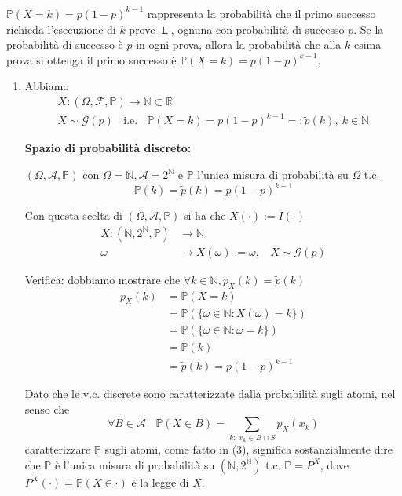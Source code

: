 \subsubsection{}
\begin{oss}
$\mathbb{P}( X=k) =p( 1-p)^{k-1}$ rappresenta la probabilità che il primo successo richieda l'esecuzione di $k$ prove $\Bot $, ognuna con probabilità di successo $p$. Se la probabilità di successo è $p$ in ogni prova, allora la probabilità che alla $k$ esima prova si ottenga il primo successo è $\mathbb{P}( X=k) =p( 1-p)^{k-1}$.
\end{oss}
\begin{enumerate}
\item Abbiamo\begin{gather*}
X:( \Omega ,\mathcal{F} ,\mathbb{P})\rightarrow \mathbb{N} \subset \mathbb{R}\\
X\sim \mathcal{G}( p) \ \ \ \ \text{i.e.} \ \ \ \ \mathbb{P}( X=k) =p( 1-p)^{k-1} =:\tilde{p}( k) ,\ k\in \mathbb{N}
\end{gather*}

\textbf{Spazio di probabilità discreto:}

$( \Omega ,\mathcal{A} ,\mathbb{P})$ con $\Omega =\mathbb{N} ,\mathcal{A} =2^{\mathbb{N}}$ e $\mathbb{P}$ l'unica misura di probabilità su $\Omega $ t.c.\begin{equation}
\mathbb{P}( k) =\tilde{p}( k) =p( 1-p)^{k-1}
\end{equation}

Con questa scelta di $( \Omega ,\mathcal{A} ,\mathbb{P})$ si ha che $X( \cdotp ) :=I( \cdotp )$\begin{align*}
X:\left(\mathbb{N} ,2^{\mathbb{N}} ,\mathbb{P}\right) & \rightarrow \mathbb{N}\\
\omega  & \rightarrow X( \omega ) :=\omega ,\ \ \ \ X\sim \mathcal{G}( p)
\end{align*}

Verifica: dobbiamo mostrare che $\forall k\in \mathbb{N} ,p_{X}( k) =\tilde{p}( k)$\begin{align*}
p_{X}( k) & =\mathbb{P}( X=k)\\
 & =\mathbb{P}(\{\omega \in \mathbb{N} :X( \omega ) =k\})\\
 & =\mathbb{P}(\{\omega \in \mathbb{N} :\omega =k\})\\
 & =\mathbb{P}( k)\\
 & =\tilde{p}( k) =p( 1-p)^{k-1}
\end{align*}

\begin{oss}
Dato che le v.c. discrete sono caratterizzate dalla probabilità sugli atomi, nel senso che
\begin{equation*}
\forall B\in \mathcal{A} \ \ \ \ \mathbb{P}( X\in B) =\sum\limits _{k:\ x_{k} \in B\cap S} p_{X}( x_{k})
\end{equation*}
caratterizzare $\mathbb{P}$ sugli atomi, come fatto in (3), significa sostanzialmente dire che $\mathbb{P}$ è l'unica misura di probabilità su $\left(\mathbb{N} ,2^{\mathbb{N}}\right)$ t.c. $\mathbb{P} =P^{X}$, dove $P^{X}( \cdotp ) =\mathbb{P}( X\in \cdotp )$ è la legge di $X$.


\end{oss}
\end{enumerate}
